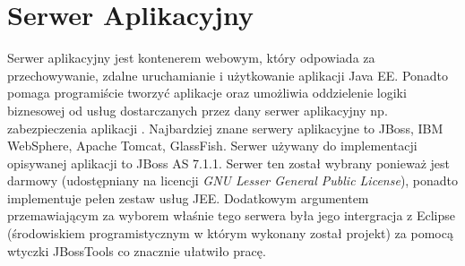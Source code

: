\section{Serwer Aplikacyjny}
\label{sec:serweraplikacyjny}
Serwer aplikacyjny jest kontenerem webowym, który odpowiada za przechowywanie, zdalne uruchamianie i użytkowanie aplikacji Java EE. Ponadto pomaga programiście tworzyć aplikacje oraz umożliwia oddzielenie logiki biznesowej od usług dostarczanych przez dany serwer aplikacyjny np. zabezpieczenia aplikacji \cite{SA01}. Najbardziej znane serwery aplikacyjne to JBoss, IBM WebSphere, Apache Tomcat, GlassFish. Serwer używany do implementacji opisywanej aplikacji to JBoss AS 7.1.1. Serwer ten został wybrany ponieważ jest darmowy (udostępniany na licencji \textit{GNU Lesser General Public License}), ponadto implementuje pełen zestaw usług JEE. Dodatkowym argumentem przemawiającym za wyborem właśnie tego serwera była jego intergracja z Eclipse (środowiskiem programistycznym w którym wykonany został projekt) za pomocą wtyczki JBossTools co znacznie ułatwiło pracę. 
